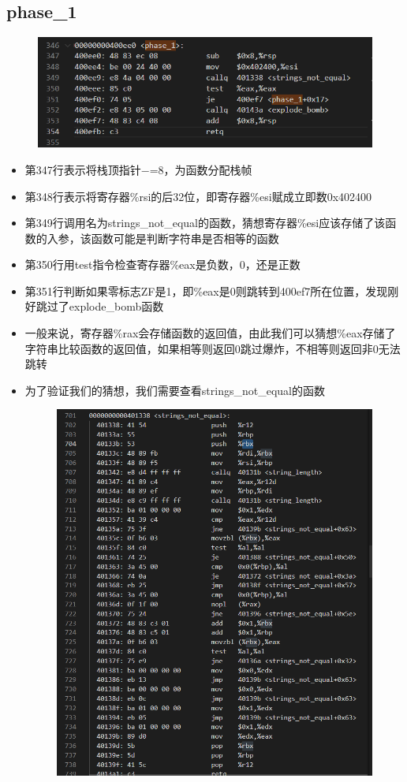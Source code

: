 \documentclass[12pt, a4paper, oneside]{ctexart}
\begin{document}
\subsection{phase\_1}
\begin{figure}[htbp]
    \includegraphics[scale=0.8]{image/2.2-1.png}
\end{figure} 
\begin{itemize}
    \item 第347行表示将栈顶指针$-$=8，为函数分配栈帧
    \item 第348行表示将寄存器\%rsi的后32位，即寄存器\%esi赋成立即数0x402400
    \item 第349行调用名为strings\_not\_equal的函数，猜想寄存器\%esi应该存储了该函数的入参，该函数可能是判断字符串是否相等的函数
    \item 第350行用test指令检查寄存器\%eax是负数，0，还是正数
    \item 第351行判断如果零标志ZF是1，即\%eax是0则跳转到400ef7所在位置，发现刚好跳过了explode\_bomb函数
    \item 一般来说，寄存器\%rax会存储函数的返回值，由此我们可以猜想\%eax存储了字符串比较函数的返回值，如果相等则返回0跳过爆炸，不相等则返回非0无法跳转
    \item 为了验证我们的猜想，我们需要查看strings\_not\_equal的函数
    \begin{figure}[htbp]
        \includegraphics[scale=0.7]{image/2.2-2.png}

\end{figure}
\end{itemize}
\end{document}
